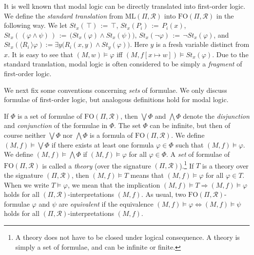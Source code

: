 \documentclass[copyright,creativecommons]{eptcs}
\begin{document}
It is well known that modal logic can be directly translated into first-order logic.
We define the \emph{standard translation} from $\mathrm{ML}(\Pi,\mathcal{R})$ into $\mathrm{FO}(\Pi,\mathcal{R})$ in
the following way. We let $\mathit{St}_x(\, \top )\, :=\, \top$, $\mathit{St}_x(P_i )\, :=\, P_i(x)$,
$\mathit{St}_x(\, (\varphi\wedge\psi)\, )\, :=\, \bigl(\mathit{St}_x(\varphi )\wedge\mathit{St}_x(\psi)\bigr)$,
$\mathit{St}_x(\neg\varphi)\, :=\, \neg\mathit{St}_x(\varphi)$, and $\mathit{St}_x(\langle R_i\, \rangle\varphi) := 
\exists y\bigl( R_i(x,y)\wedge \mathit{St}_y(\varphi)\bigr)$.
Here $y$ is a fresh variable distinct from $x$.
It is easy to see that $(M,w)\models\varphi$ iff
$(M,f[x\mapsto w])\models \mathit{St}_x(\varphi)$. 
Due to the standard translation, modal logic is often 
considered to be simply a \emph{fragment} of first-order logic.




We next fix some conventions concerning \emph{sets}
of formulae. We only discuss formulae of first-order logic,
but analogous definitions hold for modal logic.




If $\Phi$ is a set of formulae of $\mathrm{FO}(\Pi,\mathcal{R})$,
then $\bigvee\Phi$ and $\bigwedge\Phi$ denote the \emph{disjunction} and
\emph{conjunction} of the formulae in $\Phi$. The set $\Phi$ can be infinite, but 
then of course neither $\bigvee\Phi$ nor $\bigwedge\Phi$ is a formula of 
$\mathrm{FO}(\Pi,\mathcal{R})$.
We define $(M,f)\models\bigvee\Phi$ if there exists at least one formula $\varphi\in\Phi$ such that $(M,f)\models\varphi$.
We define $(M,f)\models\bigwedge\Phi$ if $(M,f)\models\varphi$ for all $\varphi\in\Phi$.
A \emph{set} of formulae of $\mathrm{FO}(\Pi,\mathcal{R})$
is called a \emph{theory} (over the
signature $(\Pi,\mathcal{R})$).\hspace{0.4mm}\footnote{A theory does not have to be closed under
logical consequence. A theory is simply a set of formulae, and
can be infinite or finite.} If $T$ is a theory over the signature $(\Pi,\mathcal{R})$,
then $(M,f)\models T$ means that $(M,f)\models\varphi$ for all $\varphi\in T$.
When we write $T\models\varphi$, we mean that
the implication $(M,f)\models T\Rightarrow (M,f)\models\varphi$ holds
for all $(\Pi,\mathcal{R})$-interpretations $(M,f)$.
As usual, two $\mathrm{FO}(\Pi,\mathcal{R})$-formulae $\varphi$ and $\psi$
are \emph{equivalent} if the equivalence $(M,f)\models \varphi\Leftrightarrow (M,f)\models \psi$ holds
for all $(\Pi,\mathcal{R})$-interpretations $(M,f)$.
\end{document}
